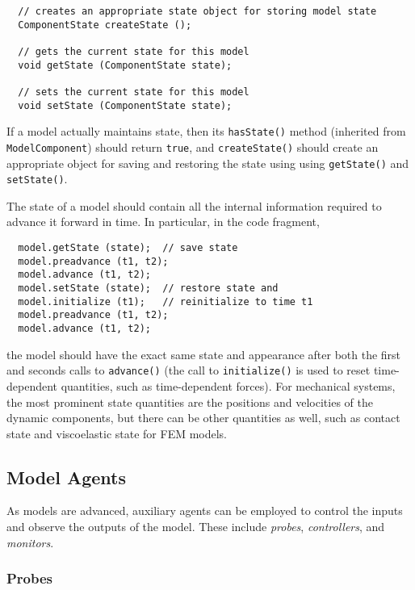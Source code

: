 \documentclass{article}
\begin{document}
\begin{lstlisting}
  // creates an appropriate state object for storing model state
  ComponentState createState ();

  // gets the current state for this model
  void getState (ComponentState state);

  // sets the current state for this model
  void setState (ComponentState state);
\end{lstlisting}

If a model actually maintains state, then its {\tt hasState()} method
(inherited from {\tt ModelComponent}) should return {\tt true}, and
{\tt createState()} should create an appropriate object for saving and
restoring the state using using {\tt getState()} and {\tt setState()}.

The state of a model should contain all the internal information
required to advance it forward in time. In particular, in the code
fragment,

\begin{lstlisting}
  model.getState (state);  // save state
  model.preadvance (t1, t2);
  model.advance (t1, t2);
  model.setState (state);  // restore state and
  model.initialize (t1);   // reinitialize to time t1
  model.preadvance (t1, t2);
  model.advance (t1, t2);
\end{lstlisting}

the model should have the exact same state and appearance after both
the first and seconds calls to {\tt advance()} (the call to {\tt initialize()} is
used to reset time-dependent quantities, such as time-dependent
forces). For mechanical systems, the most prominent state quantities
are the positions and velocities of the dynamic components, but there
can be other quantities as well, such as contact state and
viscoelastic state for FEM models.
  
\subsection{Model Agents}
\label{ModelAgentsSec}

As models are advanced, auxiliary agents can be employed to control
the inputs and observe the outputs of the model. These include
{\it probes}, {\it controllers}, and {\it monitors}.

\subsubsection{Probes}
\end{document}
